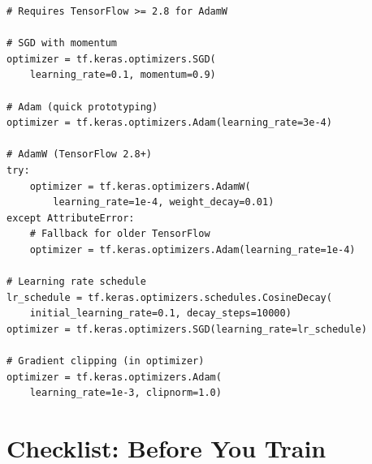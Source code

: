 \documentclass[../main.tex]{subfiles}
\begin{document}
\begin{tcolorbox}[colback=white, colframe=black!50, boxrule=0.5pt]
\begin{verbatim}
# Requires TensorFlow >= 2.8 for AdamW

# SGD with momentum
optimizer = tf.keras.optimizers.SGD(
    learning_rate=0.1, momentum=0.9)

# Adam (quick prototyping)
optimizer = tf.keras.optimizers.Adam(learning_rate=3e-4)

# AdamW (TensorFlow 2.8+)
try:
    optimizer = tf.keras.optimizers.AdamW(
        learning_rate=1e-4, weight_decay=0.01)
except AttributeError:
    # Fallback for older TensorFlow
    optimizer = tf.keras.optimizers.Adam(learning_rate=1e-4)

# Learning rate schedule
lr_schedule = tf.keras.optimizers.schedules.CosineDecay(
    initial_learning_rate=0.1, decay_steps=10000)
optimizer = tf.keras.optimizers.SGD(learning_rate=lr_schedule)

# Gradient clipping (in optimizer)
optimizer = tf.keras.optimizers.Adam(
    learning_rate=1e-3, clipnorm=1.0)
\end{verbatim}
\end{tcolorbox}

\section{Checklist: Before You Train}\label{sec:cheat-checklist}
\end{document}
